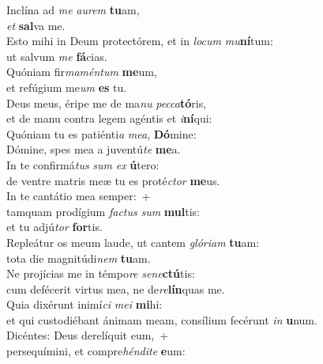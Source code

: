 \evenverse Inclína ad \textit{me} \textit{au}\textit{rem} \textbf{tu}am,~\*\\
\evenverse \textit{et} \textbf{sal}va me.\\
\oddverse Esto mihi in Deum protectórem, et in \textit{lo}\textit{cum} \textit{mu}\textbf{ní}tum:~\*\\
\oddverse ut salvum \textit{me} \textbf{fá}cias.\\
\evenverse Quóniam fir\textit{ma}\textit{mén}\textit{tum} \textbf{me}um,~\*\\
\evenverse et refúgium me\textit{um} \textbf{es} tu.\\
\oddverse Deus meus, éripe me de ma\textit{nu} \textit{pec}\textit{ca}\textbf{tó}ris,~\*\\
\oddverse et de manu contra legem agéntis et \textit{i}\textbf{ní}qui:\\
\evenverse Quóniam tu es patiénti\textit{a} \textit{me}\textit{a}, \textbf{Dó}mine:~\*\\
\evenverse Dómine, spes mea a juventú\textit{te} \textbf{me}a.\\
\oddverse In te confirmá\textit{tus} \textit{sum} \textit{ex} \textbf{ú}tero:~\*\\
\oddverse de ventre matris meæ tu es proté\textit{ctor} \textbf{me}us.\\
\evenverse In te cantátio mea semper:~+\\
\evenverse  tamquam prodígium \textit{fa}\textit{ctus} \textit{sum} \textbf{mul}tis:~\*\\
\evenverse et tu adjú\textit{tor} \textbf{for}tis.\\
\oddverse Repleátur os meum laude, ut cantem \textit{gló}\textit{ri}\textit{am} \textbf{tu}am:~\*\\
\oddverse tota die magnitúdi\textit{nem} \textbf{tu}am.\\
\evenverse Ne projícias me in témpo\textit{re} \textit{se}\textit{ne}\textbf{ctú}tis:~\*\\
\evenverse cum defécerit virtus mea, ne de\textit{re}\textbf{lín}quas me.\\
\oddverse Quia dixérunt inimí\textit{ci} \textit{me}\textit{i} \textbf{mi}hi:~\*\\
\oddverse et qui custodiébant ánimam meam, consílium fecérunt \textit{in} \textbf{u}num.\\
\evenverse Dicéntes: Deus derelíquit eum,~+\\
\evenverse  persequímini, et compre\textit{hén}\textit{di}\textit{te} \textbf{e}um:~\*\\
